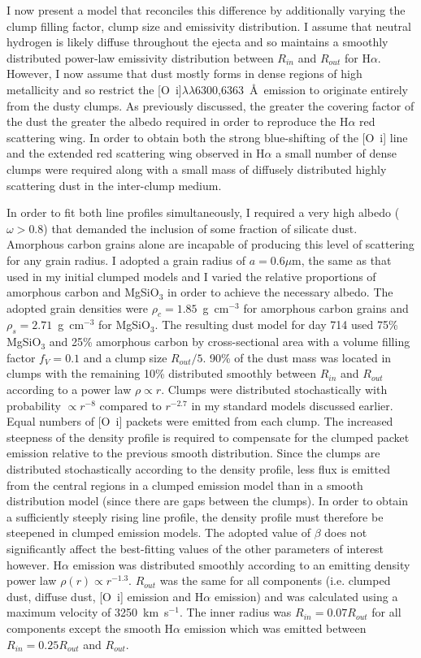 I now present a model that reconciles this difference by additionally varying the clump filling factor, clump size and emissivity distribution.  I assume that neutral hydrogen is likely diffuse throughout the ejecta and so maintains a smoothly distributed power-law emissivity distribution between $R_{in}$ and $R_{out}$ for H$\alpha$.  However, I now assume that dust mostly forms in dense regions of high metallicity and so restrict the [O~{\sc i}]$\lambda\lambda$6300,6363~\AA\ emission to originate entirely from the dusty clumps.  As previously discussed, the greater the covering factor of the dust the greater the albedo required in order to reproduce the H$\alpha$ red scattering wing. In order to obtain both the strong blue-shifting of the [O~{\sc i}] line and the extended red scattering wing observed in H$\alpha$ a small number of dense clumps were required along with a small mass of diffusely distributed highly scattering dust in the inter-clump medium.


In order to fit both line profiles simultaneously, I required a very high albedo ($\omega > 0.8$) that demanded the inclusion of some fraction of silicate dust. Amorphous carbon grains alone are incapable of producing this level of scattering for any grain radius.  I adopted a grain radius of $a=0.6\mu$m, the same as that used in my initial clumped models and I varied the relative proportions of amorphous carbon and MgSiO$_3$ in order to achieve the necessary albedo.  The adopted grain densities were $\rho_c=1.85$~g~cm$^{-3}$ for amorphous carbon grains and $\rho_s = 2.71$~g~cm$^{-3}$ for MgSiO$_3$.  The resulting dust model for day 714 used 75\% MgSiO$_3$ and 25\% amorphous carbon by cross-sectional area with a volume filling factor $f_V=0.1$ and a clump size $R_{out}/5$.  90\% of the dust mass was located in clumps with the remaining 10\% distributed smoothly between $R_{in}$ and $R_{out}$ according to a power law $\rho \propto r$. Clumps were distributed stochastically with probability $\propto r^{-8}$ compared to $r^{-2.7}$ in my standard models discussed earlier. Equal numbers of [O~{\sc i}] packets were emitted from each clump. The increased steepness of the density profile is required to compensate for the clumped packet emission relative to the previous smooth distribution.  Since the clumps are distributed stochastically according to the density profile, less flux is emitted from the central regions in a clumped emission model than in a smooth distribution model (since there are gaps between the clumps).  In order to obtain a sufficiently steeply rising line profile, the density profile must therefore be steepened in clumped emission models. The adopted value of $\beta$ does not significantly affect the best-fitting values of the other parameters of interest however.  H$\alpha$ emission was distributed smoothly according to an emitting density power law $\rho(r) \propto r^{-1.3}$.  $R_{out}$ was the same for all components (i.e. clumped dust, diffuse dust, [O~{\sc i}] emission and H$\alpha$ emission) and was calculated using a maximum velocity of 3250~km~s$^{-1}$.  The inner radius was $R_{in} = 0.07 R_{out}$ for all components except the smooth H$\alpha$ emission which was emitted between $R_{in}=0.25R_{out}$ and $R_{out}$.  

